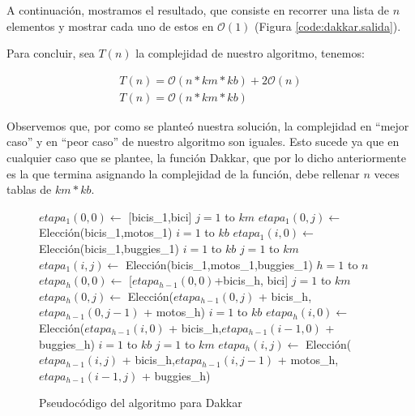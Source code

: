 A continuación, mostramos el resultado, que consiste en recorrer una lista de $n$ elementos y mostrar cada uno de estos en $\mathcal{O}(1)$ (Figura \ref{code:dakkar.salida}).

Para concluir, sea $T(n)$ la complejidad de nuestro algoritmo, tenemos:

\begin{equation*}
\begin{array}{l}
T(n) = \mathcal{O}(n*km*kb) + 2\mathcal{O}(n)\\
T(n) = \mathcal{O}(n*km*kb)
\end{array}
\end{equation*}

Observemos que, por como se planteó nuestra solución, la complejidad en ``mejor caso'' y en ``peor caso'' de nuestro algoritmo son iguales. Esto sucede ya que en cualquier caso que se plantee, la función {\sc Dakkar}, que por lo dicho anteriormente es la que termina asignando la complejidad de la función, debe rellenar $n$ veces tablas de $km*kb$.


\begin{figure}[!ht]
\begin{codebox}
\li $etapa_1(0,0) \leftarrow$ [bicis_1,bici]
\li \For $j = 1$ to $km$
\li 		\Do $etapa_1(0,j) \leftarrow$ {\sc Elección}(bicis_1,motos_1)
		\End
\li \For $i = 1$ to $kb$
\li 		\Do $etapa_1(i,0) \leftarrow$ {\sc Elección}(bicis_1,buggies_1)
		\End		
\li \For $i = 1$ to $kb$
\li 		\Do 
		\For $j = 1$ to $km$
\li			\Do $etapa_1(i,j) \leftarrow$ {\sc Elección}(bicis_1,motos_1,buggies_1)
			\End
		\End
\li \For $h = 1$ to $n$
\li 		\Do 
			$etapa_h(0,0) \leftarrow$ [$etapa_{h-1}(0,0)$+bicis_h, bici]
\li 			\For $j = 1$ to $km$
\li 				\Do $etapa_h(0,j) \leftarrow$ {\sc Elección}($etapa_{h-1}(0,j)$ + bicis_h,$etapa_{h-1}(0,j-1)$ + motos_h)
				\End
\li 			\For $i = 1$ to $kb$
\li 				\Do $etapa_h(i,0) \leftarrow$ {\sc Elección}($etapa_{h-1}(i,0)$ + bicis_h,$etapa_{h-1}(i-1,0)$ + buggies_h)
				\End
\li 			\For $i = 1$ to $kb$
\li 				\Do
				\For $j = 1$ to $km$
\li	 				\Do $etapa_h(i,j) \leftarrow$ {\sc Elección}($etapa_{h-1}(i,j)$ + bicis_h,$etapa_{h-1}(i,j-1)$ + motos_h,\\ \hspace*{10cm} $etapa_{h-1}(i-1,j)$ + buggies_h)
					\End
				\End
		\End
\end{codebox} 
\caption{Pseudocódigo del algoritmo para Dakkar}\label{code:dakkar}
\end{figure}
\FloatBarrier

